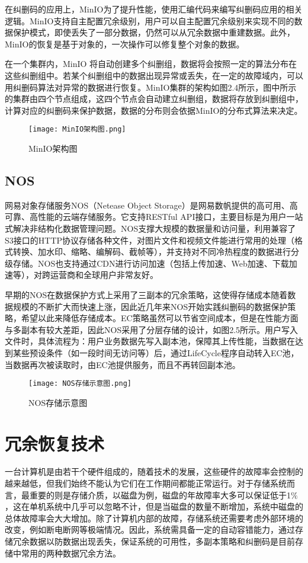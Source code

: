 在纠删码的应用上，MinIO为了提升性能，使用汇编代码来编写纠删码应用的相关逻辑。MinIO支持自主配置冗余级别，用户可以自主配置冗余级别来实现不同的数据保护模式，即使丢失了一部分数据，仍然可以从冗余数据中重建数据。此外，MinIO的恢复是基于对象的，一次操作可以修复整个对象的数据。

在一个集群内，MinIO 将自动创建多个纠删组，数据将会按照一定的算法分布在这些纠删组中。若某个纠删组中的数据出现异常或丢失，在一定的故障域内，可以用纠删码算法对异常的数据进行恢复。MinIO集群的架构如图2.4所示，图中所示的集群由四个节点组成，这四个节点会自动建立纠删组，数据将存放到纠删组中，计算对应的纠删码来保护数据，数据的分布则会依据MinIO的分布式算法来决定。

\begin{figure}
    \centering
    \texttt{[image: MinIO架构图.png]}
    \caption{MinIO架构图}
\end{figure}

\subsection{NOS}%
网易对象存储服务NOS（Netease Object Storage）是网易数帆提供的高可用、高可靠、高性能的云端存储服务。它支持RESTful API接口，主要目标是为用户一站式解决非结构化数据管理问题。NOS支撑大规模的数据量和访问量，利用兼容了S3接口的HTTP协议存储各种文件，对图片文件和视频文件能进行常用的处理（格式转换、加水印、缩略、编解码、截帧等），并支持对不同冷热程度的数据进行分级存储。NOS也支持通过CDN进行访问加速（包括上传加速、Web加速、下载加速等），对跨运营商和全球用户非常友好。

早期的NOS在数据保护方式上采用了三副本的冗余策略，这使得存储成本随着数据规模的不断扩大而快速上涨，因此近几年来NOS开始实践纠删码的数据保护策略，希望以此来降低存储成本。EC策略虽然可以节省空间成本，但是在性能方面与多副本有较大差距，因此NOS采用了分层存储的设计，如图2.5所示。用户写入文件时，具体流程为：用户业务数据先写入副本池，保障其上传性能，当数据在达到某些预设条件（如一段时间无访问等）后，通过LifeCycle程序自动转入EC池，当数据再次被读取时，由EC池提供服务，而且不再转回副本池。

\begin{figure}
    \centering
    \texttt{[image: NOS存储示意图.png]}
    \caption{NOS存储示意图}
\end{figure}

\section{冗余恢复技术}%
一台计算机是由若干个硬件组成的，随着技术的发展，这些硬件的故障率会控制的越来越低，但我们始终不能认为它们在工作期间都能正常运行。对于存储系统而言，最重要的则是存储介质，以磁盘为例，磁盘的年故障率大多可以保证低于1$\%$\cite{34}，这在单机系统中几乎可以忽略不计，但是当磁盘的数量不断增加，系统中磁盘的总体故障率会大大增加。除了计算机内部的故障，存储系统还需要考虑外部环境的改变，例如断电断网等极端情况。因此，系统需具备一定的自动容错能力，通过存储冗余数据以防数据出现丢失，保证系统的可用性，多副本\cite{35}策略和纠删码\cite{36}是目前存储中常用的两种数据冗余方法。

